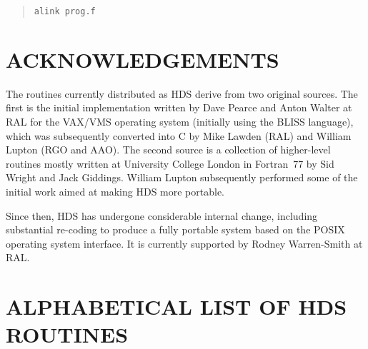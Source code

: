 \documentclass[11pt]{article}
\newcommand{\htmlref}[2]{#1}
\newcommand{\xlabel}[1]{}
\begin{document}
\small
\begin{quote}
\begin{verbatim}
alink prog.f
\end{verbatim}
\end{quote}
\normalsize

\section{ACKNOWLEDGEMENTS}

The \htmlref{routines}{appendix:alphalist} currently distributed as
HDS derive from two original sources. The first is the initial
implementation written by Dave Pearce and Anton Walter at RAL for the
VAX/VMS operating system (initially using the BLISS language), which
was subsequently converted into C by Mike Lawden (RAL) and William
Lupton (RGO and AAO). The second source is a collection of
higher-level routines mostly written at University College London in
Fortran~77 by Sid Wright and Jack Giddings. William Lupton
subsequently performed some of the initial work aimed at making HDS
more portable.

Since then, HDS has undergone considerable internal change, including
substantial re-coding to produce a fully portable system based on the
POSIX operating system interface. It is currently supported by Rodney
Warren-Smith at RAL.

\appendix

\newpage
\section{\xlabel{alphabetical_list_of_routines}\label{appendix:alphalist}ALPHABETICAL LIST OF HDS ROUTINES}

\end{document}
